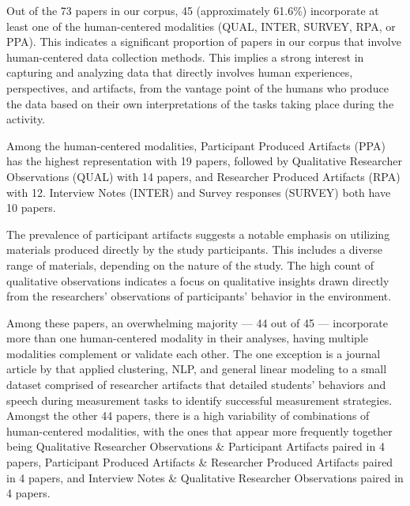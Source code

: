 \documentclass[manuscript,screen,review]{acmart}
\begin{document}





Out of the 73 papers in our corpus, 45 (approximately 61.6\%) incorporate at least one of the human-centered modalities (QUAL, INTER, SURVEY, RPA, or PPA). This indicates a significant proportion of papers in our corpus that involve human-centered data collection methods. This implies a strong interest in capturing and analyzing data that directly involves human experiences, perspectives, and artifacts, from the vantage point of the humans who produce the data based on their own interpretations of the tasks taking place during the activity.

Among the human-centered modalities, Participant Produced Artifacts (PPA) has the highest representation with 19 papers, followed by Qualitative Researcher Observations (QUAL) with 14 papers, and Researcher Produced Artifacts (RPA) with 12. Interview Notes (INTER) and Survey responses (SURVEY) both have 10 papers. 

The prevalence of participant artifacts suggests a notable emphasis on utilizing materials produced directly by the study participants. This includes a diverse range of materials, depending on the nature of the study. The high count of qualitative observations indicates a focus on qualitative insights drawn directly from the researchers' observations of participants' behavior in the environment.

Among these papers, an overwhelming majority --- 44 out of 45 --- incorporate more than one human-centered modality in their analyses, having multiple modalities complement or validate each other. The one exception is a journal article by \citet{3809293172} that applied clustering, NLP, and general linear modeling to a small dataset comprised of researcher artifacts that detailed students' behaviors and speech during measurement tasks to identify successful measurement strategies. Amongst the other 44 papers, there is a high variability of combinations of human-centered modalities, with the ones that appear more frequently together being Qualitative Researcher Observations \& Participant Artifacts paired in 4 papers, Participant Produced Artifacts \& Researcher Produced Artifacts paired in 4 papers, and Interview Notes \& Qualitative Researcher Observations paired in 4 papers.
\end{document}
